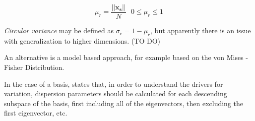 \begin{equation}
\mu_r = \frac{||\mathbf{x_s}||}{N}\ \ \ 0\leq \mu_r \leq 1
\end{equation}

\textit{Circular variance} may be defined as $\sigma_c = 1-\mu_r$, but apparently there is an issue with generalization to higher dimensions. (TO DO)

An alternative is a model based approach, for example based on the von Mises - Fisher Distribution.

In the case of a basis,  states that, in order to understand the drivers for variation, dispersion parameters should be calculated for each descending subspace of the basis, first including all of the eigenvectors, then excluding the first eigenvector, etc.
